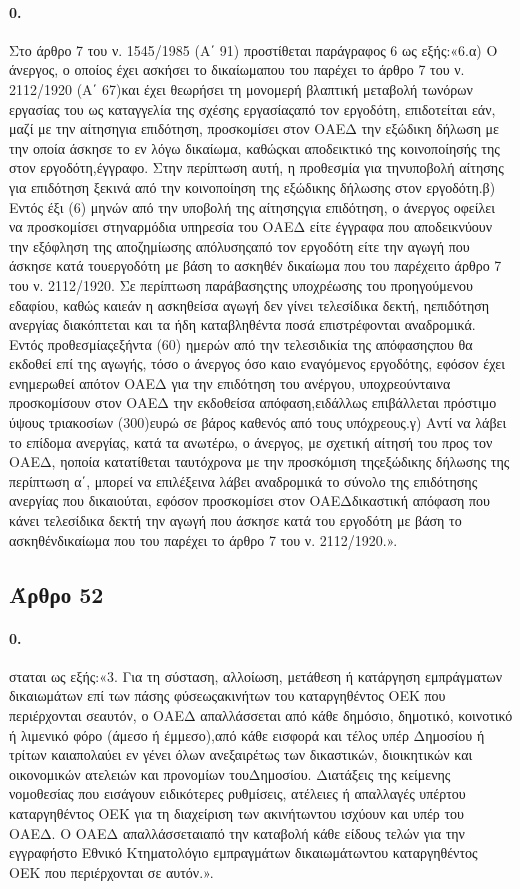 \documentclass[a4paper,oneside, 10pt]{book}
\begin{document}
\paragraph { 0. } Στο άρθρο 7 του ν. 1545/1985 (Α΄ 91) προστίθεται παράγραφος 6 ως εξής:«6.α) Ο άνεργος, ο οποίος έχει ασκήσει το δικαίωμαπου του παρέχει το άρθρο 7 του ν. 2112/1920 (Α΄ 67)και έχει θεωρήσει τη μονομερή βλαπτική μεταβολή τωνόρων εργασίας του ως καταγγελία της σχέσης εργασίαςαπό τον εργοδότη, επιδοτείται εάν, μαζί με την αίτησηγια επιδότηση, προσκομίσει στον ΟΑΕΔ την εξώδικη δήλωση με την οποία άσκησε το εν λόγω δικαίωμα, καθώςκαι αποδεικτικό της κοινοποίησής της στον εργοδότη,έγγραφο. Στην περίπτωση αυτή, η προθεσμία για τηνυποβολή αίτησης για επιδότηση ξεκινά από την κοινοποίηση της εξώδικης δήλωσης στον εργοδότη.β) Εντός έξι (6) μηνών από την υποβολή της αίτησηςγια επιδότηση, ο άνεργος οφείλει να προσκομίσει στηναρμόδια υπηρεσία του ΟΑΕΔ είτε έγγραφα που αποδεικνύουν την εξόφληση της αποζημίωσης απόλυσηςαπό τον εργοδότη είτε την αγωγή που άσκησε κατά τουεργοδότη με βάση το ασκηθέν δικαίωμα που του παρέχειτο άρθρο 7 του ν. 2112/1920. Σε περίπτωση παράβασηςτης υποχρέωσης του προηγούμενου εδαφίου, καθώς καιεάν η ασκηθείσα αγωγή δεν γίνει τελεσίδικα δεκτή, ηεπιδότηση ανεργίας διακόπτεται και τα ήδη καταβληθέντα ποσά επιστρέφονται αναδρομικά. Εντός προθεσμίαςεξήντα (60) ημερών από την τελεσιδικία της απόφασηςπου θα εκδοθεί επί της αγωγής, τόσο ο άνεργος όσο καιο εναγόμενος εργοδότης, εφόσον έχει ενημερωθεί απότον ΟΑΕΔ για την επιδότηση του ανέργου, υποχρεούνταινα προσκομίσουν στον ΟΑΕΔ την εκδοθείσα απόφαση,ειδάλλως επιβάλλεται πρόστιμο ύψους τριακοσίων (300)ευρώ σε βάρος καθενός από τους υπόχρεους.γ) Αντί να λάβει το επίδομα ανεργίας, κατά τα ανωτέρω, ο άνεργος, με σχετική αίτησή του προς τον ΟΑΕΔ, ηοποία κατατίθεται ταυτόχρονα με την προσκόμιση τηςεξώδικης δήλωσης της περίπτωση α΄, μπορεί να επιλέξεινα λάβει αναδρομικά το σύνολο της επιδότησης ανεργίας που δικαιούται, εφόσον προσκομίσει στον ΟΑΕΔδικαστική απόφαση που κάνει τελεσίδικα δεκτή την αγωγή που άσκησε κατά του εργοδότη με βάση το ασκηθένδικαίωμα που του παρέχει το άρθρο 7 του ν. 2112/1920.».
\subsection*{ Άρθρο 52 }
\paragraph { 0. } σταται ως εξής:«3. Για τη σύσταση, αλλοίωση, μετάθεση ή κατάργηση εμπράγματων δικαιωμάτων επί των πάσης φύσεωςακινήτων του καταργηθέντος ΟΕΚ που περιέρχονται σεαυτόν, ο ΟΑΕΔ απαλλάσσεται από κάθε δημόσιο, δημοτικό, κοινοτικό ή λιμενικό φόρο (άμεσο ή έμμεσο),από κάθε εισφορά και τέλος υπέρ Δημοσίου ή τρίτων καιαπολαύει εν γένει όλων ανεξαιρέτως των δικαστικών, διοικητικών και οικονομικών ατελειών και προνομίων τουΔημοσίου. Διατάξεις της κείμενης νομοθεσίας που εισάγουν ειδικότερες ρυθμίσεις, ατέλειες ή απαλλαγές υπέρτου καταργηθέντος ΟΕΚ για τη διαχείριση των ακινήτωντου ισχύουν και υπέρ του ΟΑΕΔ. Ο ΟΑΕΔ απαλλάσσεταιαπό την καταβολή κάθε είδους τελών για την εγγραφήστο Εθνικό Κτηματολόγιο εμπραγμάτων δικαιωμάτωντου καταργηθέντος ΟΕΚ που περιέρχονται σε αυτόν.».
\end{document}
